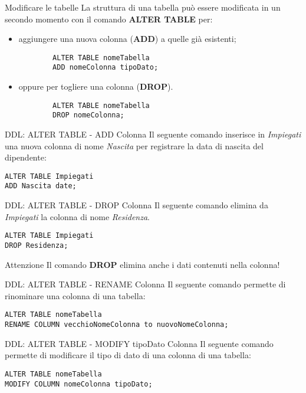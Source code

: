 %
\begin{frame}[fragile]{Modificare le tabelle}
La struttura di una tabella pu\`o essere modificata in un secondo momento con il comando \textbf{ALTER TABLE} per:
\begin{itemize}
    \item aggiungere una nuova colonna (\textbf{ADD}) a quelle gi\`a esistenti;
    \begin{lstlisting}
        ALTER TABLE nomeTabella
        ADD nomeColonna tipoDato;
    \end{lstlisting}
    \item oppure per togliere una colonna (\textbf{DROP}).
    \begin{lstlisting}
        ALTER TABLE nomeTabella
        DROP nomeColonna;
    \end{lstlisting}
\end{itemize}
\end{frame}
%
\begin{frame}[fragile]{DDL: ALTER TABLE - ADD Colonna}
Il seguente comando inserisce in \textit{Impiegati} una nuova colonna di nome \textit{Nascita} per registrare la data di nascita del dipendente:
\begin{lstlisting}
ALTER TABLE Impiegati
ADD Nascita date;
\end{lstlisting}
\end{frame}
%
\begin{frame}[fragile]{DDL: ALTER TABLE - DROP Colonna}
Il seguente comando elimina da \textit{Impiegati} la colonna di nome \textit{Residenza}.
\begin{lstlisting}
ALTER TABLE Impiegati
DROP Residenza;
\end{lstlisting}
\begin{minipage}{0.7\textwidth}
    \begin{alertblock}{Attenzione}
        Il comando \textbf{DROP} elimina anche i dati contenuti nella colonna!
    \end{alertblock}
\end{minipage}
\end{frame}
%
\begin{frame}[fragile]{DDL: ALTER TABLE - RENAME Colonna}
Il seguente comando permette di rinominare una colonna di una tabella:
\begin{lstlisting}
ALTER TABLE nomeTabella
RENAME COLUMN vecchioNomeColonna to nuovoNomeColonna;
\end{lstlisting}
\end{frame}
%
\begin{frame}[fragile]{DDL: ALTER TABLE - MODIFY tipoDato Colonna}
Il seguente comando permette di modificare il tipo di dato di una colonna di una tabella:
\begin{lstlisting}
ALTER TABLE nomeTabella
MODIFY COLUMN nomeColonna tipoDato;
\end{lstlisting}
\end{frame}
